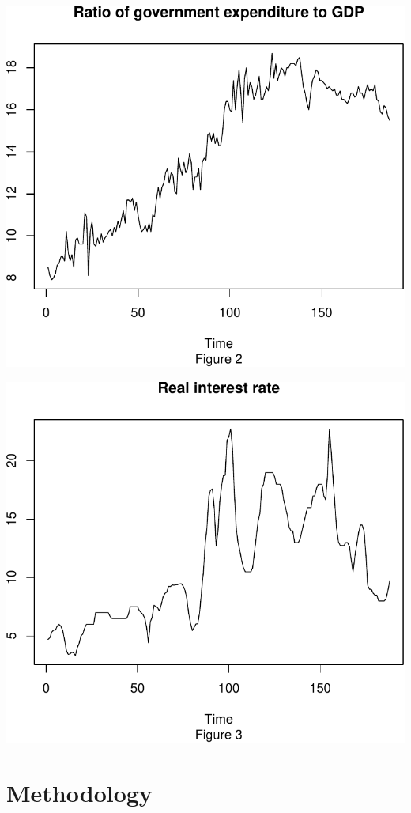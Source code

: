 \documentclass[11pt,preprint, authoryear]{elsarticle}
\numberwithin{equation}{section}
\numberwithin{figure}{section}
\numberwithin{table}{section}
\begin{document}
\includegraphics{TS_proj_files/figure-latex/unnamed-chunk-13-1.pdf}

\includegraphics{TS_proj_files/figure-latex/unnamed-chunk-14-1.pdf}

\hypertarget{methodology}{%
\section{Methodology}\label{methodology}}
\end{document}

